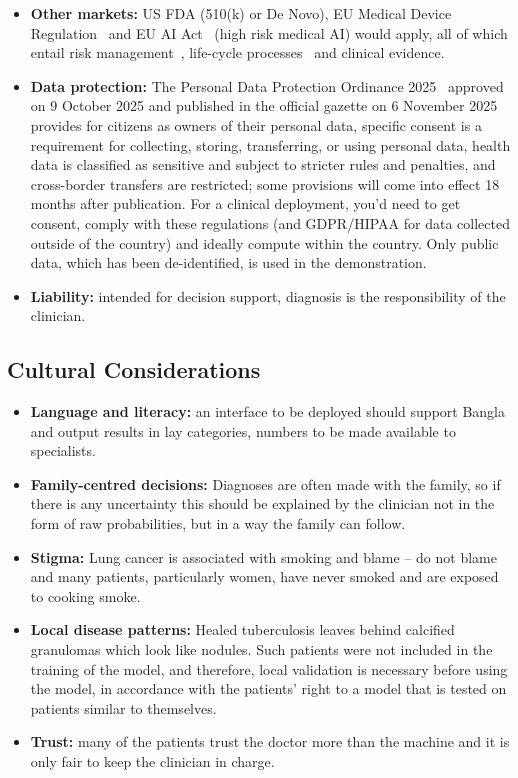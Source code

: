 \begin{itemize}
  \item \textbf{Other markets:} US FDA (510(k) or De Novo), EU Medical Device Regulation~\cite{eumdr} and EU AI Act~\cite{euaiact} (high risk medical AI) would apply, all of which entail risk management~\cite{iso14971}, life-cycle processes~\cite{iec62304} and clinical evidence.\item \textbf{Data protection:} The Personal Data Protection Ordinance 2025~\cite{bdpdpo2025} approved on 9 October 2025 and published in the official gazette on 6 November 2025 provides for citizens as owners of their personal data, specific consent is a requirement for collecting, storing, transferring, or using personal data, health data is classified as sensitive and subject to stricter rules and penalties, and cross-border transfers are restricted; some provisions will come into effect 18 months after publication. For a clinical deployment, you'd need to get consent, comply with these regulations (and GDPR/HIPAA for data collected outside of the country) and ideally compute within the country. Only public data, which has been de-identified, is used in the demonstration.\item \textbf{Liability:} intended for decision support, diagnosis is the responsibility of the clinician.
\end{itemize}

\subsection{Cultural Considerations}

\begin{itemize}
  \item \textbf{Language and literacy:} an interface to be deployed should support Bangla and output results in lay categories, numbers to be made available to specialists.\item \textbf{Family-centred decisions:} Diagnoses are often made with the family, so if there is any uncertainty this should be explained by the clinician not in the form of raw probabilities, but in a way the family can follow.\item \textbf{Stigma:} Lung cancer is associated with smoking and blame -- do not blame and many patients, particularly women, have never smoked and are exposed to cooking smoke.\item \textbf{Local disease patterns:} Healed tuberculosis leaves behind calcified granulomas which look like nodules. Such patients were not included in the training of the model, and therefore, local validation is necessary before using the model, in accordance with the patients' right to a model that is tested on patients similar to themselves.\item \textbf{Trust:} many of the patients trust the doctor more than the machine and it is only fair to keep the clinician in charge.
\end{itemize}

